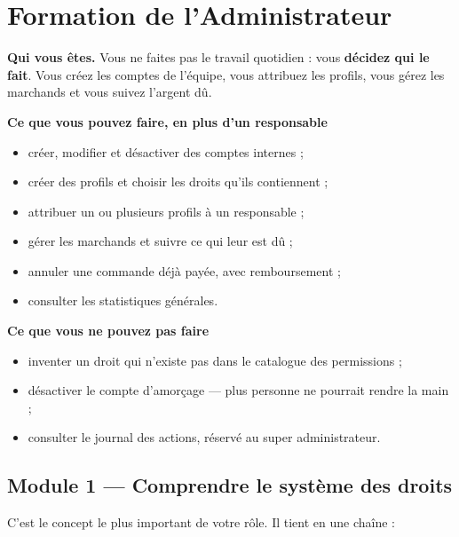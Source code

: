 \documentclass[11pt,a4paper]{report}
\begin{document}
\chapter{Formation de l'Administrateur}
\label{ch:admin}

\begin{roleBox}
\textbf{Qui vous êtes.} Vous ne faites pas le travail quotidien : vous
\textbf{décidez qui le fait}. Vous créez les comptes de l'équipe, vous
attribuez les profils, vous gérez les marchands et vous suivez l'argent dû.

\medskip
\textbf{Ce que vous pouvez faire, en plus d'un responsable}
\begin{itemize}[leftmargin=*,itemsep=2pt,topsep=3pt]
  \item créer, modifier et désactiver des comptes internes ;
  \item créer des profils et choisir les droits qu'ils contiennent ;
  \item attribuer un ou plusieurs profils à un responsable ;
  \item gérer les marchands et suivre ce qui leur est dû ;
  \item annuler une commande déjà payée, avec remboursement ;
  \item consulter les statistiques générales.
\end{itemize}

\medskip
\textbf{Ce que vous ne pouvez pas faire}
\begin{itemize}[leftmargin=*,itemsep=2pt,topsep=3pt]
  \item inventer un droit qui n'existe pas dans le catalogue des permissions ;
  \item désactiver le compte d'amorçage — plus personne ne pourrait rendre la
        main ;
  \item consulter le journal des actions, réservé au super administrateur.
\end{itemize}
\end{roleBox}

\section{Module 1 — Comprendre le système des droits}

C'est le concept le plus important de votre rôle. Il tient en une chaîne :
\end{document}
